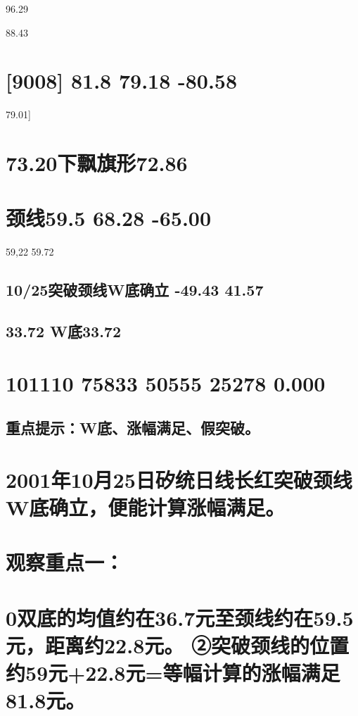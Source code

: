 \documentclass{article}
\begin{document}
96.29

88.43

\section{[9008] 81.8 79.18 -80.58}

79.01]

\section{73.20下飘旗形72.86}

\section{颈线59.5 68.28 -65.00}

59,22 59.72

\subsection{10/25突破颈线W底确立 -49.43 41.57}

\subsection{33.72 W底33.72}

\section{101110 75833 50555 25278 0.000}

\subsection{重点提示：W底、涨幅满足、假突破。}

\section{2001年10月25日矽统日线长红突破颈线W底确立，便能计算涨幅满足。}

\section{观察重点一：}

\section{0双底的均值约在36.7元至颈线约在59.5元，距离约22.8元。 ②突破颈线的位置约59元+22.8元=等幅计算的涨幅满足81.8元。}
\end{document}
